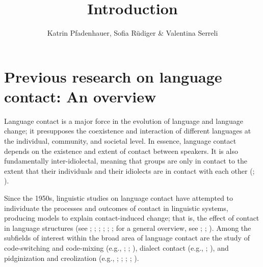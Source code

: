\documentclass[output=paper
		  ]{langscibook}
\author{Katrin Pfadenhauer\orcid{ 0000-0002-7411-2932}, Sofia Rüdiger\orcid{ 0000-0003-4370-8052} \& Valentina Serreli \orcid{ 0000-0002-4944-3107} \affiliation{University of Bayreuth}}
\title{Introduction}
\begin{document}
\maketitle

\section{Previous research on language contact: An overview}

Language contact is a major force in the evolution of language and language change; it presupposes the coexistence and interaction of different languages at the individual, community, and societal level. In essence, language contact depends on the existence and extent of contact between speakers. It is also fundamentally inter-idiolectal, meaning that groups are only in contact to the extent that their individuals and their idiolects are in contact with each other (\citealt{mufwene_ecology_2001}; \citealt{mufwene_individuals_2012}).
 
Since the 1950s, linguistic studies on language contact have attempted to individuate the processes and outcomes of contact in linguistic systems, producing models to explain contact-induced change; that is, the effect of contact in language structures (see \citealt{weinreich_languages_1953}; \citealt{thomason_language_1988}; \citealt{thomason_language_2001}; \citealt{van_coetsem_general_2000}; \citealt{heine_language_2005}; \citealt{bakker_contact_2013}; for a general overview, see \citealt{winford_introduction_2003}; \citealt{matras_language_2009}; \citealt{hickey_handbook_2010}). Among the subfields of interest within the broad area of language contact are the study of code-switching and code-mixing (e.g., \citealt{muysken_bilingual_2000}; \citealt{myers-scotton_contact_2002}; \citealt{gardner-chloros_code-switching_2009}), dialect contact (e.g., \citealt{trudgill_dialects_1986}; \citealt{kerswilll_creating_2000}), and pidginization and creolization (e.g., \citealt{arends_pidgins_1994}; \citealt{siegel_emergence_2008}; \citealt{aboh_emergence_2015}; \citealt{velupillai_pidgins_2015}; \citealt{knorr_creolization_2018}). 
\end{document}
